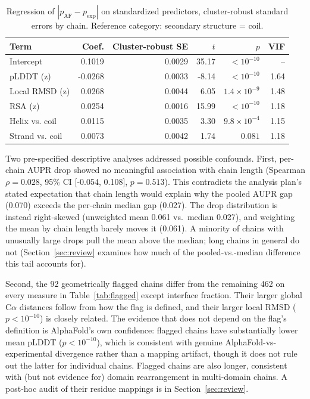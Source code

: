\documentclass[10pt]{article}
\begin{document}
\begin{table}[t]
\centering
\small
\begin{tabular}{lrrrrr}
\toprule
Term & Coef. & Cluster-robust SE & $t$ & $p$ & VIF \\
\midrule
Intercept & 0.1019 & 0.0029 & 35.17 & $< 10^{-10}$ & -- \\
pLDDT (z) & -0.0268 & 0.0033 & -8.14 & $< 10^{-10}$ & 1.64 \\
Local RMSD (z) & 0.0268 & 0.0044 & 6.05 & $1.4\times10^{-9}$ & 1.48 \\
RSA (z) & 0.0254 & 0.0016 & 15.99 & $< 10^{-10}$ & 1.18 \\
Helix vs. coil & 0.0115 & 0.0035 & 3.30 & $9.8\times10^{-4}$ & 1.15 \\
Strand vs. coil & 0.0073 & 0.0042 & 1.74 & $0.081$ & 1.18 \\
\bottomrule
\end{tabular}
\caption{Regression of $|p_{\mathrm{AF}}-p_{\mathrm{exp}}|$ on standardized
predictors, cluster-robust standard errors by chain.
Reference category: secondary structure = coil.}
\label{tab:regression}
\end{table}



Two pre-specified descriptive analyses addressed possible confounds. First,
per-chain AUPR drop showed no meaningful association with chain length
(Spearman $\rho = 0.028$, 95\% CI [-0.054, 0.108], $p = 0.513$). This
contradicts the analysis plan's stated expectation that chain length would
explain why the pooled AUPR gap (0.070) exceeds the per-chain
median gap (0.027). The drop distribution is instead
right-skewed (unweighted mean 0.061 vs.\ median
0.027), and weighting the mean by chain length barely
moves it (0.061). A minority of chains with unusually large
drops pull the mean above the median; long chains in general do not
(Section~\ref{sec:review} examines how much of the pooled-vs.-median
difference this tail accounts for).

Second, the 92 geometrically flagged chains differ from
the remaining 462 on every measure in Table~\ref{tab:flagged}
except interface fraction. Their larger global C$\alpha$ distances follow
from how the flag is defined, and their larger local RMSD ($p < 10^{-10}$) is closely related.
The evidence that does not depend on the flag's definition is AlphaFold's own
confidence: flagged chains have substantially lower mean pLDDT
($p < 10^{-10}$), which is consistent with genuine
AlphaFold-vs-experimental divergence rather than a mapping artifact, though
it does not rule out the latter for individual chains. Flagged chains are
also longer, consistent with (but not evidence for) domain rearrangement in
multi-domain chains. A post-hoc audit of their residue mappings is in
Section~\ref{sec:review}.
\end{document}
